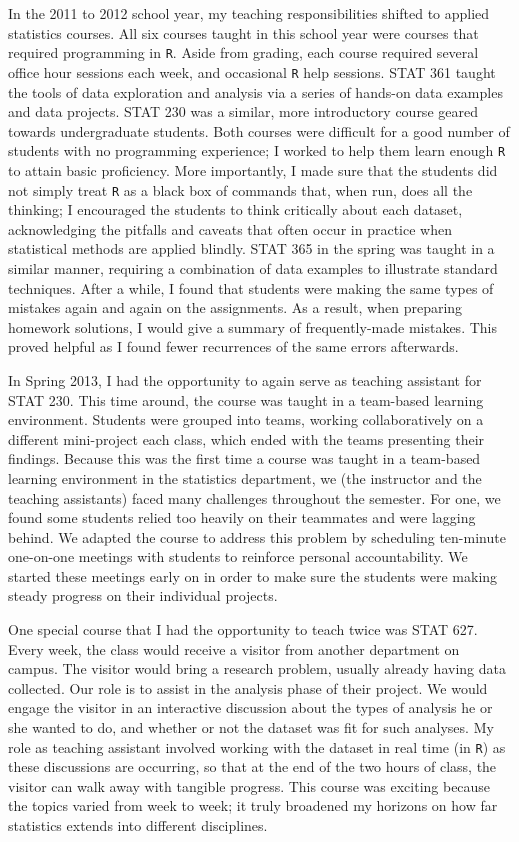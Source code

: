 \documentclass[11pt]{article}
\begin{document}
In the 2011 to 2012 school year, my teaching responsibilities shifted to applied statistics courses. All six courses taught in this school year were courses that required programming in \verb|R|. Aside from grading, each course required several office hour sessions each week, and occasional \verb|R| help sessions. STAT 361 taught the tools of data exploration and analysis via a series of hands-on data examples and data projects. STAT 230 was a similar, more introductory course geared towards undergraduate students. Both courses were difficult for a good number of students with no programming experience; I worked to help them learn enough \verb|R| to attain basic proficiency. More importantly, I made sure that the students did not simply treat \verb|R| as a black box of commands that, when run, does all the thinking; I encouraged the students to think critically about each dataset, acknowledging the pitfalls and caveats that often occur in practice when statistical methods are applied blindly. STAT 365 in the spring was taught in a similar manner, requiring a combination of data examples to illustrate standard techniques. After a while, I found that students were making the same types of mistakes again and again on the assignments. As a result, when preparing homework solutions, I would give a summary of frequently-made mistakes. This proved helpful as I found fewer recurrences of the same errors afterwards. 

In Spring 2013, I had the opportunity to again serve as teaching assistant for STAT 230. This time around, the course was taught in a team-based learning environment. Students were grouped into teams, working collaboratively on a different mini-project each class, which ended with the teams presenting their findings. Because this was the first time a course was taught in a team-based learning environment in the statistics department, we (the instructor and the teaching assistants) faced many challenges throughout the semester. For one, we found some students relied too heavily on their teammates and were lagging behind. We adapted the course to address this problem by scheduling ten-minute one-on-one meetings with students to reinforce personal accountability. We started these meetings early on in order to make sure the students were making steady progress on their individual projects. 

One special course that I had the opportunity to teach twice was STAT 627. Every week, the class would receive a visitor from another department on campus. The visitor would bring a research problem, usually already having data collected. Our role is to assist in the analysis phase of their project. We would engage the visitor in an interactive discussion about the types of analysis he or she wanted to do, and whether or not the dataset was fit for such analyses. My role as teaching assistant involved working with the dataset in real time (in \verb|R|) as these discussions are occurring, so that at the end of the two hours of class, the visitor can walk away with tangible progress. This course was exciting because the topics varied from week to week; it truly broadened my horizons on how far statistics extends into different disciplines.  
\end{document}
